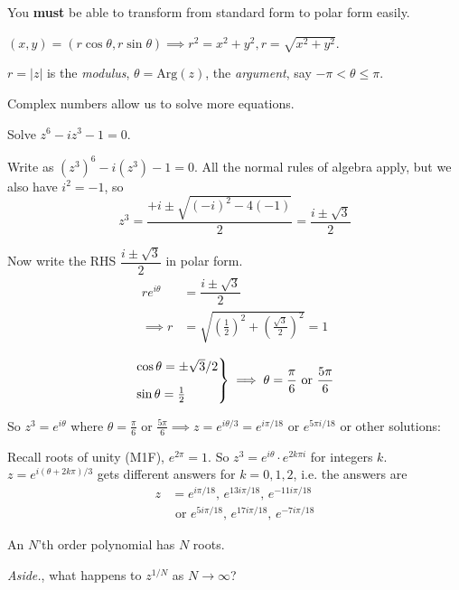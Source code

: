 \documentclass[10pt]{scrartcl}
\begin{document}
You \textbf{must} be able to transform from standard form to polar form easily. 

$(x,y) = (r\cos\theta, r\sin\theta) \implies r^2 = x^2 + y^2, r = \sqrt{x^2 + y^2}$.\\

\begin{definition}
$r = |z|$ is the \emph{modulus}, $\theta = \mathrm{Arg}(z)$, the \emph{argument}, say $-\pi < \theta \leq \pi$. 	
\end{definition}

Complex numbers allow us to solve more equations.\\

\begin{example} Solve $z^6 - iz^3 -1 = 0$. 

Write as $(z^3)^6 - i(z^3) - 1 = 0$. All the normal rules of algebra apply, but we also have $i^2 = -1$, so 
\[
  z^3 = \frac{+i \pm \sqrt{(-i)^2 -4(-1)}}{2} = \frac{i\pm \sqrt{3}}{2}
 \]
 
 Now write the RHS $\dfrac{i \pm \sqrt{3}}{2}$ in polar form. 
\begin{align*}
  re^{i\theta} &= \dfrac{i \pm \sqrt{3}}{2} \\
  \implies r &= \sqrt{\textstyle{(\frac{1}{2})^2 + (\frac{\sqrt{3}}{2})^2}} = 1 
\end{align*}

\[
  \begin{rcases*}
  \cos\theta = \pm \sqrt{3}/2\\[.2cm]
  \sin\theta = \frac{1}{2}	
  \end{rcases*} \implies \theta = \frac{\pi}{6} \text{ or } \frac{5\pi}{6}
\]

So $z^3 = e^{i\theta}$ where $\theta = \frac{\pi}{6}$ or $\frac{5\pi}{6} \implies z = e^{i\theta/3} = e^{i\pi/18}$ or $e^{5\pi i/18}$ or other solutions:

Recall roots of unity (M1F), $e^{2\pi} = 1$. So $z^3 = e^{i\theta}\cdot e^{2k\pi i}$ for integers $k$. $z = e^{i(\theta + 2k\pi)/3}$ gets different answers for $k = 0,1,2$, i.e. the answers are 
\begin{align*}
  z &= e^{i\pi/18},\,  e^{13i\pi/18},\,e^{-11i\pi/18}\\
  &\text{ or } e^{5i\pi/18},\, e^{17i\pi/18},\, e^{-7i\pi/18}
\end{align*}
\end{example}

An $N$'th order polynomial has $N$ roots.

\emph{Aside.}, what happens to $z^{1/N}$ as $N \to \infty$? 
\end{document}
